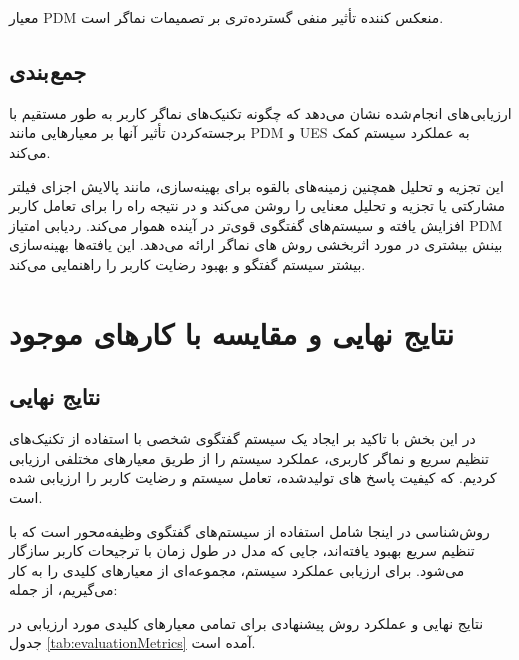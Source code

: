 معیار PDM منعکس کننده تأثیر منفی گسترده‌تری بر تصمیمات نماگر است.




\subsection{جمع بندی}
ارزیابی های انجام شده نشان می‌دهد که چگونه تکنیک‌های نماگر کاربر به طور مستقیم با برجسته‌کردن تأثیر آنها بر معیارهایی مانند PDM و UES به عملکرد سیستم کمک می‌کند. 

این تجزیه و تحلیل همچنین زمینه‌های بالقوه برای بهینه‌سازی، مانند پالایش اجزای فیلتر مشارکتی یا تجزیه و تحلیل معنایی را روشن می‌کند و در نتیجه راه را برای تعامل کاربر افزایش‌ یافته و سیستم‌های گفتگوی قوی‌تر در آینده هموار می‌کند. ردیابی امتیاز PDM بینش بیشتری در مورد اثربخشی روش های نماگر ارائه می‌دهد. این یافته‌ها بهینه‌سازی بیشتر سیستم گفتگو و بهبود رضایت کاربر را راهنمایی می‌کند.

\section{نتایج نهایی و مقایسه با کارهای موجود}

\subsection{نتایج نهایی}
در این بخش با تاکید بر ایجاد یک سیستم گفتگوی شخصی با استفاده از تکنیک‌های تنظیم سریع و نماگر کاربری، عملکرد سیستم را از طریق معیارهای مختلفی ارزیابی کردیم. که کیفیت پاسخ های تولید‌شده، تعامل سیستم و رضایت کاربر را ارزیابی شده است. 

روش‌شناسی در اینجا شامل استفاده از سیستم‌های گفتگوی وظیفه‌محور است که با تنظیم سریع بهبود یافته‌اند، جایی که مدل در طول زمان با ترجیحات کاربر سازگار می‌شود. برای ارزیابی عملکرد سیستم، مجموعه‌ای از معیارهای کلیدی را به کار می‌گیریم، از جمله:

نتایج نهایی و عملکرد روش پیشنهادی برای تمامی معیارهای کلیدی مورد ارزیابی در جدول%
\ref{tab:evaluationMetrics}
آمده است.


